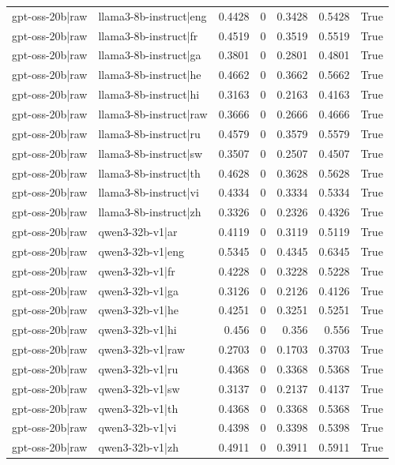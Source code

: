 \begin{table}
\begin{tabular}{l l r r r r l}
gpt-oss-20b|raw & llama3-8b-instruct|eng & 0.4428 & 0 & 0.3428 & 0.5428 & True \\
gpt-oss-20b|raw & llama3-8b-instruct|fr & 0.4519 & 0 & 0.3519 & 0.5519 & True \\
gpt-oss-20b|raw & llama3-8b-instruct|ga & 0.3801 & 0 & 0.2801 & 0.4801 & True \\
gpt-oss-20b|raw & llama3-8b-instruct|he & 0.4662 & 0 & 0.3662 & 0.5662 & True \\
gpt-oss-20b|raw & llama3-8b-instruct|hi & 0.3163 & 0 & 0.2163 & 0.4163 & True \\
gpt-oss-20b|raw & llama3-8b-instruct|raw & 0.3666 & 0 & 0.2666 & 0.4666 & True \\
gpt-oss-20b|raw & llama3-8b-instruct|ru & 0.4579 & 0 & 0.3579 & 0.5579 & True \\
gpt-oss-20b|raw & llama3-8b-instruct|sw & 0.3507 & 0 & 0.2507 & 0.4507 & True \\
gpt-oss-20b|raw & llama3-8b-instruct|th & 0.4628 & 0 & 0.3628 & 0.5628 & True \\
gpt-oss-20b|raw & llama3-8b-instruct|vi & 0.4334 & 0 & 0.3334 & 0.5334 & True \\
gpt-oss-20b|raw & llama3-8b-instruct|zh & 0.3326 & 0 & 0.2326 & 0.4326 & True \\
gpt-oss-20b|raw & qwen3-32b-v1|ar & 0.4119 & 0 & 0.3119 & 0.5119 & True \\
gpt-oss-20b|raw & qwen3-32b-v1|eng & 0.5345 & 0 & 0.4345 & 0.6345 & True \\
gpt-oss-20b|raw & qwen3-32b-v1|fr & 0.4228 & 0 & 0.3228 & 0.5228 & True \\
gpt-oss-20b|raw & qwen3-32b-v1|ga & 0.3126 & 0 & 0.2126 & 0.4126 & True \\
gpt-oss-20b|raw & qwen3-32b-v1|he & 0.4251 & 0 & 0.3251 & 0.5251 & True \\
gpt-oss-20b|raw & qwen3-32b-v1|hi & 0.456 & 0 & 0.356 & 0.556 & True \\
gpt-oss-20b|raw & qwen3-32b-v1|raw & 0.2703 & 0 & 0.1703 & 0.3703 & True \\
gpt-oss-20b|raw & qwen3-32b-v1|ru & 0.4368 & 0 & 0.3368 & 0.5368 & True \\
gpt-oss-20b|raw & qwen3-32b-v1|sw & 0.3137 & 0 & 0.2137 & 0.4137 & True \\
gpt-oss-20b|raw & qwen3-32b-v1|th & 0.4368 & 0 & 0.3368 & 0.5368 & True \\
gpt-oss-20b|raw & qwen3-32b-v1|vi & 0.4398 & 0 & 0.3398 & 0.5398 & True \\
gpt-oss-20b|raw & qwen3-32b-v1|zh & 0.4911 & 0 & 0.3911 & 0.5911 & True \\

\end{tabular}
\end{table}
